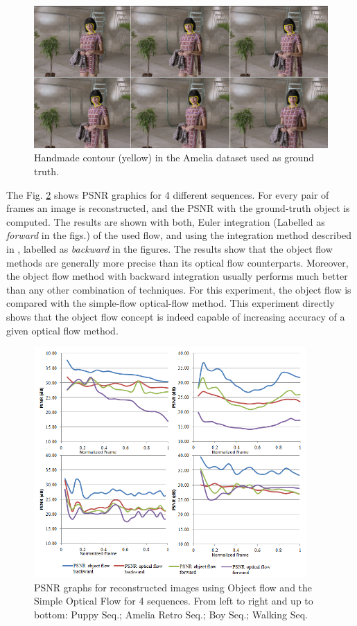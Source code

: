    \begin{figure}[thpb]
      \centering
      \includegraphics[width=1.0\textwidth]{../images/handmade_contour.png}
      \caption{Handmade contour (yellow) in the Amelia dataset used as ground truth.}
      \label{handmade}
   \end{figure}

The Fig. \ref{of_res} shows PSNR graphics for 4 different sequences. For every pair of frames an image is reconstructed, and the PSNR with the ground-truth object is computed.
The results are shown with both, Euler integration (Labelled as {\it forward} in the figs.) of the used flow, 
and using the integration method described in \cite{c20}, labelled as {\it backward} in the figures. The results show that the object flow methods are generally more precise than its optical flow 
counterparts. Moreover, the object flow method with backward integration usually performs much better than any other combination of techniques. For this experiment, the object flow is compared with the simple-flow optical-flow method. This experiment directly shows that the object flow concept is indeed capable of increasing accuracy of a given optical flow method. 

   \begin{figure}[hb]
      \centering
      \includegraphics[width=0.925\textwidth]{../images/psnr_v2.png}
      \caption{PSNR graphs for reconstructed images using Object flow and the Simple Optical Flow for 4 sequences. From left to right and up to bottom: Puppy Seq.; Amelia Retro Seq.; Boy Seq.; Walking Seq.}
      \label{of_res}
   \end{figure}


